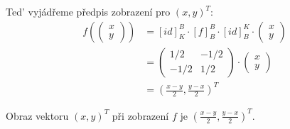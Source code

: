 \documentclass[12pt]{article}
\begin{document}
\begin{enumerate}
  Ted' vyjádřeme předpis zobrazení pro $(x,y)^T$:
  \begin{align*}
    f\left( \left(\begin{array}{c} x\\y \end{array}\right) \right) 
      &= [id]^B_K \cdot [f]^B_B \cdot [id]^K_B \cdot \left(\begin{array}{c} x\\y \end{array}\right) \\
      &= \left(\begin{array}{cc}
        1/2 & -1/2 \\
        -1/2 & 1/2
      \end{array}\right) \cdot \left(\begin{array}{c} x\\y \end{array}\right) \\
      &= \left( \frac{x-y}{2},\frac{y-x}{2} \right)^T
  \end{align*}

  Obraz vektoru $(x,y)^T$ při zobrazení $f$ je \underline{\underline{$\left( \frac{x-y}{2},\frac{y-x}{2} \right)^T$}}.


\end{enumerate}
\end{document}
